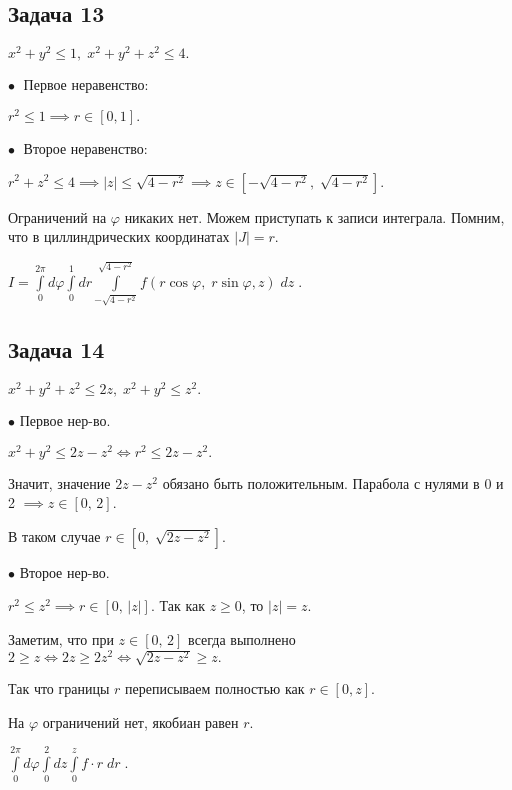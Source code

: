 \documentclass[a4paper, fleqn]{article}
\begin{document}
    \subsection*{Задача 13}
    
    $x^2 + y^2 \leq 1, \; x^2 + y^2 + z^2 \leq 4.$
    
    $\bullet \; $ Первое неравенство:
    
    $r^2 \leq 1 \implies r \in [0,1].$
    
    $\bullet \; $ Второе неравенство:
    
    $r^2 + z^2 \leq 4 \implies |z| \leq \sqrt{4 - r^2} \implies z \in [-\sqrt{4 - r^2}, \; \sqrt{4 - r^2}].$
    
    Ограничений на  $\varphi$ никаких нет. Можем приступать к записи интеграла. Помним, что в циллиндрических координатах $|J| = r.$
    
    $I = \boxed{\displaystyle \int\limits_{0}^{2 \pi} d \varphi \int\limits_{0}^{1} dr \int\limits_{-\sqrt{4 - r^2}}^{\sqrt{4 - r^2}} f(r \cos \varphi, \; r \sin \varphi, z) \; dz} \; .$
    
     
    \subsection*{Задача 14}
    
    $x^2 + y^2 + z^2 \leq  2z, \; x^2 + y^2 \leq z^2.$
    
    $\bullet$ Первое нер-во.
    
    $x^2 + y^2 \leq 2z - z^2 \iff r^2 \leq 2z-z^2.$ 
    
    Значит, значение $2z - z^2$ обязано быть положительным. Парабола с нулями в 0 и 2 $\implies z \in [0, \, 2].$
    
    В таком случае $r \in \left[0, \; \sqrt{2z - z^2} \right].$
    
    $\bullet$ Второе нер-во.
    
    $r^2 \leq z^2 \implies r \in \left[0, \, |z|\right].$ Так как $z \geq 0$, то $|z| = z.$ 
    
    Заметим, что при $z \in [0, \, 2]$ всегда выполнено $2 \geq z \iff 2z \geq 2z^2 \iff \sqrt{2z - z^2} \geq z .$
    
    Так что границы $r$ переписываем полностью как $r \in [0,z].$
    
    На $\varphi$ ограничений нет, якобиан равен $r$.
    
    $\boxed{\displaystyle \int\limits_{0}^{2 \pi} d \varphi \int\limits_{0}^{2} dz \int\limits_{0}^{z} f \cdot r \; dr} \; .$
    
\end{document}
